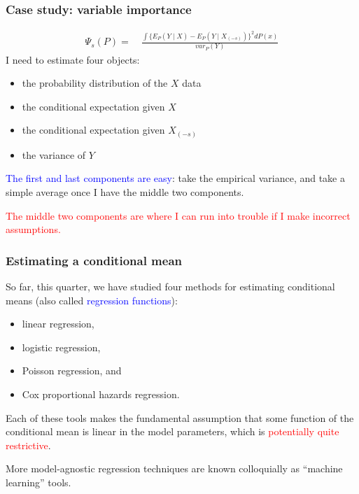 \documentclass[12pt, 
hyperref={colorlinks=true, linkcolor=blue, urlcolor=cyan},dvipsnames]{beamer}
\begin{document}
\begin{frame}
\frametitle{Case study: variable importance}
\vspace{-0.75cm}
\begin{align*}
\Psi_s(P) = &\ \frac{\int \{E_P(Y \mid X) - E_P(Y \mid X_{(-s)})\}^2 dP(x)}{var_P(Y)}
\end{align*}
\vspace{-0.4cm}
I need to estimate four objects:
\begin{itemize}
\item the probability distribution of the $X$ data \pause
\item the conditional expectation given $X$ \pause
\item the conditional expectation given $X_{(-s)}$ \pause
\item the variance of $Y$ \pause
\end{itemize}

\textcolor{blue}{The first and last components are easy}: take the empirical variance, and take a simple average once I have the middle two components. \pause

\textcolor{red}{The middle two components are where I can run into trouble if I make incorrect assumptions. }
\end{frame}

\begin{frame}
\frametitle{Estimating a conditional mean}
So far, this quarter, we have studied four methods for estimating conditional means (also called \textcolor{blue}{regression functions}):
\begin{itemize}
\item linear regression,
\item logistic regression, 
\item Poisson regression, and
\item Cox proportional hazards regression.
\end{itemize}

Each of these tools makes the fundamental assumption that some function of the conditional mean is linear in the model parameters, which is \textcolor{red}{potentially quite restrictive}. 

More model-agnostic regression techniques are known colloquially as ``machine learning'' tools.
\end{frame}
\end{document}
